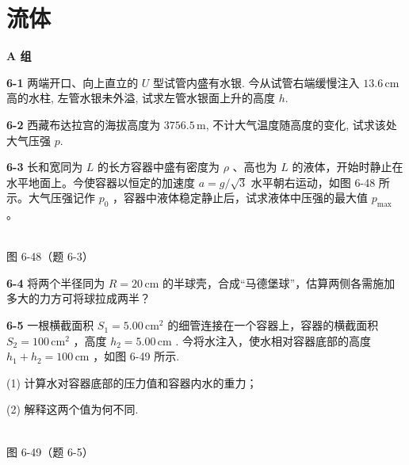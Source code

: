 \chapter{流体}
\begin{center}\textbf{A 组}\end{center}

\textbf{6-1} 两端开口、向上直立的 $U$ 型试管内盛有水银. 今从试管右端缓慢注入 $13.6\,\mathrm{cm}$ 高的水柱, 左管水银未外溢, 试求左管水银面上升的高度 $h$.

\newpage

\textbf{6-2} 西藏布达拉宫的海拔高度为 $3756.5\,\mathrm m$, 不计大气温度随高度的变化, 试求该处大气压强 $p$.

\newpage

\textbf{6-3} 长和宽同为 $L$ 的长方容器中盛有密度为 $\rho$ 、高也为 $L$ 的液体，开始时静止在水平地面上。今使容器以恒定的加速度 $a = g / \sqrt{3}$ 水平朝右运动，如图 6-48 所示。大气压强记作 $p_{0}$ ，容器中液体稳定静止后，试求液体中压强的最大值 $p_{\max}$ 。

\begin{center}
\resizebox{0.50\textwidth}{!}{}\\[4pt]
{\small 图 6-48（题 6-3）}
\end{center}

\newpage

\textbf{6-4} 将两个半径同为 $R=20\,\mathrm{cm}$ 的半球壳，合成“马德堡球”，估算两侧各需施加多大的力方可将球拉成两半？

\newpage

\textbf{6-5} 一根横截面积 $S_{1} = 5.00\,\mathrm{cm}^{2}$ 的细管连接在一个容器上，容器的横截面积 $S_{2} = 100\,\mathrm{cm}^{2}$ ，高度 $h_2 = 5.00\,\mathrm{cm}$ . 今将水注入，使水相对容器底部的高度 $h_1 + h_2 = 100\,\mathrm{cm}$ ，如图 6-49 所示.

(1) 计算水对容器底部的压力值和容器内水的重力；

(2) 解释这两个值为何不同.

\begin{center}
\resizebox{0.44\textwidth}{!}{}\\[4pt]
{\small 图 6-49（题 6-5）}
\end{center}

\newpage

